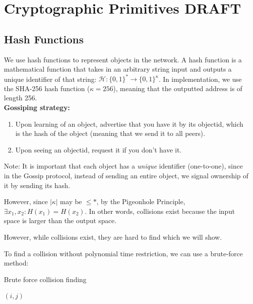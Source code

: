 \chapter{Cryptographic Primitives \small{\textsf{DRAFT}}}

\section{Hash Functions}
\quad We use hash functions to represent objects in the network. A hash function is a mathematical function that takes in an arbitrary string input and outputs a unique identifier of that string: $\mathcal{H}: \{0,1\}^* \rightarrow \{0,1\}^\kappa$.
In implementation, we use the SHA-256 hash function ($\kappa = 256$), meaning that the outputted address is of length 256. \\

\textbf{Gossiping strategy: }
\begin{enumerate}
    \item Upon learning of an object, advertise that you have it by its objectid, which is the hash of the object (meaning that we send it to all peers).
    \item Upon seeing an objectid, request it if you don't have it.
\end{enumerate}
Note: It is important that each object has a \textit{unique} identifier (one-to-one), since in the Gossip protocol, instead of sending an entire object, we signal ownership of it by sending its hash.\newline

However, since $|\kappa|$ may be $\leq *$, by the Pigeonhole Principle, $\exists x_1, x_2: H(x_1)=H(x_2)$. In other words, collisions exist because the input space is larger than the output space.

However, while collisions exist, they are hard to find which we will show.

To find a collision without polynomial time restriction, we can use a brute-force method: \\
\begin{algorithm}
\caption{Brute force collision finding}
\label{a'2}
\begin{algorithmic}[1]
        \State \Return $(i,j)$
    \EndIf
    \EndFor
    \EndFor
\EndFunction
\end{algorithmic}
\end{algorithm}



